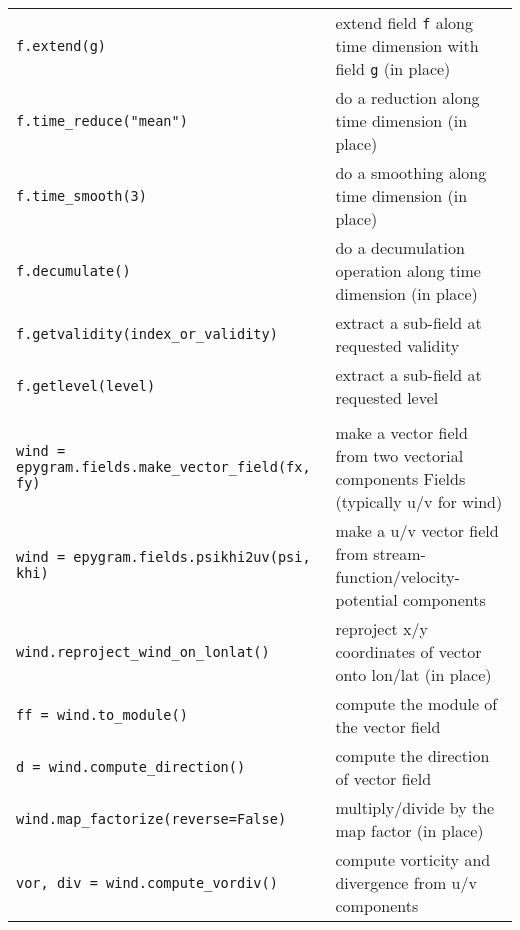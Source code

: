 \documentclass[a4paper,10pt]{article}
\begin{document}
\begin{tabular}{|p{9.5cm}|p{9.5cm}|}
\hline
\rowcolor{gray!50}
\multicolumn{2}{|c|}{\textbf{n-D Fields}}\\
\hline
\texttt{f.extend(g)} & extend field \texttt{f} along time dimension with field \texttt{g} (in place)\\
\texttt{f.time\_reduce("mean")} & do a reduction along time dimension (in place)\\
\texttt{f.time\_smooth(3)} & do a smoothing along time dimension (in place)\\
\texttt{f.decumulate()} & do a decumulation operation along time dimension (in place)\\
\texttt{f.getvalidity(index\_or\_validity)} & extract a sub-field at requested validity\\
\texttt{f.getlevel(level)} & extract a sub-field at requested level\\
\hline
\rowcolor{gray!50}
\multicolumn{2}{|c|}{\textbf{Vector Fields}}\\
\hline
\texttt{wind = epygram.fields.make\_vector\_field(fx, fy)} & make a vector field from two vectorial components Fields (typically u/v for wind)\\
\texttt{wind = epygram.fields.psikhi2uv(psi, khi)} & make a u/v vector field from stream-function/velocity-potential components \footnotemark[1]\\
\texttt{wind.reproject\_wind\_on\_lonlat()} & reproject x/y coordinates of vector onto lon/lat (in place)\\
\texttt{ff = wind.to\_module()} & compute the module of the vector field\\
\texttt{d = wind.compute\_direction()} & compute the direction of vector
 field\\
\texttt{wind.map\_factorize(reverse=False)} & multiply/divide by the map factor (in place)\\
\texttt{vor, div = wind.compute\_vordiv()} & compute vorticity and divergence from u/v components \footnotemark[1]\\
\hline
\end{tabular}\\
\\

\end{document}
